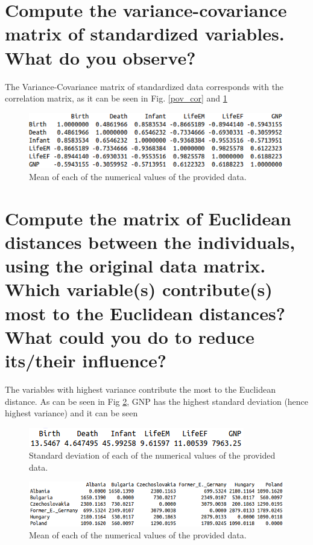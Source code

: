 \documentclass[10pt, a4paper, oneside]{article}
\begin{document}
\section{Compute the variance-covariance matrix of standardized variables. What do you observe?}

The Variance-Covariance matrix of standardized data corresponds with the correlation matrix, as it can be seen in Fig. \ref{pov_cor} and \ref{sd_cov}

\vspace{5mm}
\begin{figure}[h!]\centering\includegraphics[scale=0.6]{pov_sd_cov.png}\caption{Mean of each of the numerical values of the provided data.}\label{sd_cov}\end{figure}
\vspace{5mm}

\section{Compute the matrix of Euclidean distances between the individuals, using the original data matrix. Which variable(s) contribute(s) most to the Euclidean distances? What could you do to reduce its/their influence?}

The variables with highest variance contribute the most to the Euclidean distance. As can be seen in Fig \ref{pov_sd}, GNP has the highest standard deviation (hence highest variance) and it can be seen 

\vspace{5mm}
\begin{figure}[h!]\centering\includegraphics[scale=0.6]{pov_sd.png}\caption{Standard deviation of each of the numerical values of the provided data.}\label{pov_sd}\end{figure}
\vspace{5mm}

\vspace{5mm}
\begin{figure}[h!]\centering\includegraphics[scale=0.6]{pov_eucl_dist.png}\caption{Mean of each of the numerical values of the provided data.}\label{mean}\end{figure}
\vspace{5mm}
\end{document}
